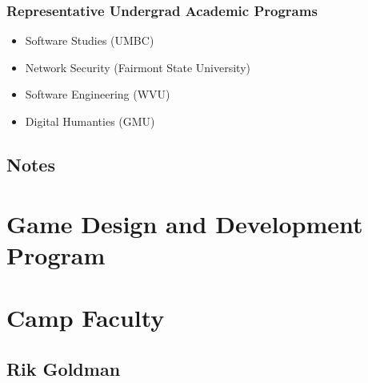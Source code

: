 \documentclass[letterpaper,10pt,english]{sphinxmanual}
\begin{document}
\subsection{Representative Undergrad Academic Programs}
\label{cybersecurity:representative-undergrad-academic-programs}\begin{itemize}
\item {} 
Software Studies (UMBC)

\item {} 
Network Security (Fairmont State University)

\item {} 
Software Engineering (WVU)

\item {} 
Digital Humanties (GMU)

\end{itemize}


\section{Notes}
\label{cybersecurity:notes}

\chapter{Game Design and Development Program}
\label{gamedev:game-design-and-development-program}\label{gamedev::doc}\label{gamedev:index-1}

\chapter{Camp Faculty}
\label{faculty:camp-faculty}\label{faculty::doc}

\section{Rik Goldman}
\label{faculty:rik-goldman}
\end{document}
